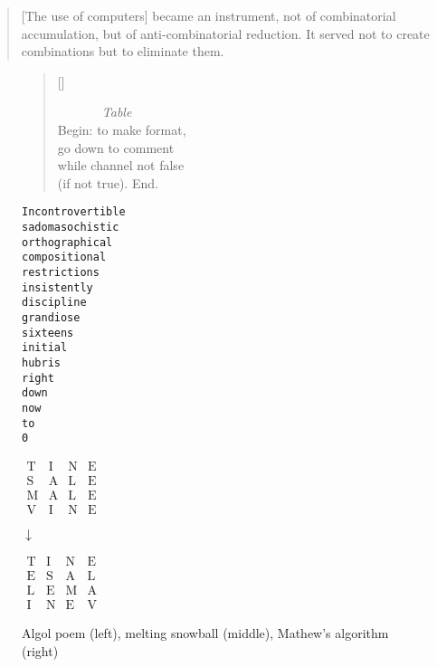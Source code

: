 \begin{quotation}
  [The use of computers] became an instrument, not of combinatorial accumulation, but of anti-combinatorial reduction. It served not to create combinations but to eliminate them.
\end{quotation}

\begin{figure}[!htbp]
\begin{minipage}{.42\linewidth}
  \settowidth{\versewidth}{while channel not false} 
  \begin{verse}[\versewidth]
  \begin{patverse}\ttfamily
    ~~~~~~~\textit{Table}\\
    Begin: to make format,\\
    go down to comment\\
    while channel not false\\
      (if not true). End.\\ 
  \end{patverse}
  \end{verse}
\end{minipage}
\begin{minipage}{.32\linewidth}
  \begin{alltt}\ttfamily\centering
    Incontrovertible
    sadomasochistic
    orthographical
    compositional
    restrictions 
    insistently
    discipline
    grandiose
    sixteens
    initial
    hubris
    right
    down
    now
    to
    0
  \end{alltt}
\end{minipage}
\begin{minipage}{.24\linewidth}
  \centering
  $\begin{matrix}
    \text{T}&\text{I}&\text{N}&\text{E}\\
    \text{S}&\text{A}&\text{L}&\text{E}\\
    \text{M}&\text{A}&\text{L}&\text{E}\\
    \text{V}&\text{I}&\text{N}&\text{E}
  \end{matrix}$

  \vspace{5mm}

  $\downarrow$

  \vspace{5mm}

  $\begin{matrix}
    \text{T}&\text{I}&\text{N}&\text{E}\\
    \text{E}&\text{S}&\text{A}&\text{L}\\
    \text{L}&\text{E}&\text{M}&\text{A}\\
    \text{I}&\text{N}&\text{E}&\text{V}
  \end{matrix}$
\end{minipage}
\caption[Algol poem, melting snowball, Mathew's algorithm]{Algol poem (left), melting snowball (middle), Mathew's algorithm (right)}
\label{fig:poems}
\end{figure}

